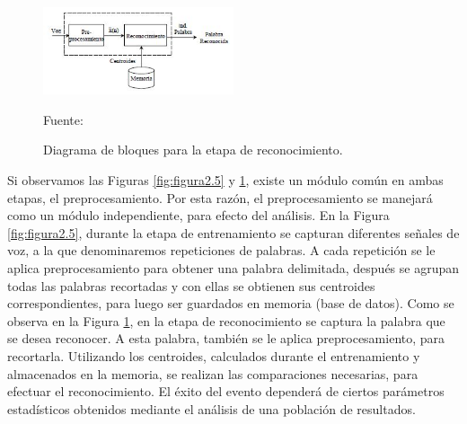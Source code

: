 \begin{figure}[ht]
\begin{center}
\includegraphics[width=0.5\textwidth]{Imagenes/Cap2/image006}
\end{center}
\begin{center}
\vskip -0.5cm
\caption{\small{Diagrama de bloques para la etapa de reconocimiento.}}
\label{fig:figura2.6}
{\small{Fuente: \cite{navarrete}}}
\end{center}
\end{figure}

Si observamos las Figuras \ref{fig:figura2.5} y \ref{fig:figura2.6}, existe un módulo común en ambas etapas, el preprocesamiento. Por esta razón, el preprocesamiento se manejará como un módulo independiente, para efecto del análisis.
\vskip 0.5cm
En la Figura \ref{fig:figura2.5}, durante la etapa de entrenamiento se capturan diferentes señales de voz, a la que denominaremos repeticiones de palabras. A cada repetición se le aplica preprocesamiento para obtener una palabra delimitada, después se agrupan todas las palabras recortadas y con ellas se obtienen sus centroides correspondientes, para luego ser guardados en memoria (base de datos).
\vskip 0.5cm
Como se observa en la Figura \ref{fig:figura2.6}, en la etapa de reconocimiento se captura la palabra que se desea reconocer. A esta palabra, también se le aplica preprocesamiento, para recortarla. Utilizando los centroides, calculados durante el entrenamiento y almacenados en la memoria, se realizan las comparaciones necesarias, para efectuar el reconocimiento. El éxito del evento dependerá de ciertos parámetros estadísticos obtenidos mediante el análisis de una población de resultados.

